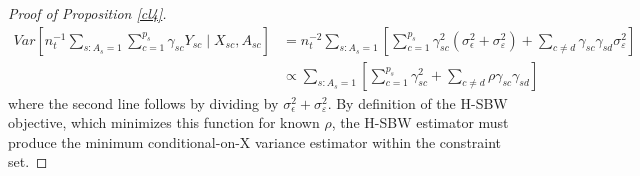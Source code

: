 


\begin{proof}[Proof of Proposition \ref{cl4}]
\begin{align*}
    Var[n_t^{-1}\sum_{s: A_s = 1}\sum_{c = 1}^{p_s}\gamma_{sc}Y_{sc} \mid X_{sc}, A_{sc}] &= n_t^{-2}\sum_{s: A_s = 1}[\sum_{c = 1}^{p_s}\gamma_{sc}^2(\sigma^2_{\epsilon} + \sigma^2_{\varepsilon}) + \sum_{c \ne d}\gamma_{sc}\gamma_{sd}\sigma^2_{\varepsilon}] \\
    &\propto \sum_{s: A_s = 1}[\sum_{c = 1}^{p_s}\gamma_{sc}^2 + \sum_{c \ne d}\rho \gamma_{sc}\gamma_{sd}]
\end{align*}
%
where the second line follows by dividing by $\sigma^2_{\epsilon} + \sigma^2_{\varepsilon}$. By definition of the H-SBW objective, which minimizes this function for known $\rho$, the H-SBW estimator must produce the minimum conditional-on-X variance estimator within the constraint set.
\end{proof}


